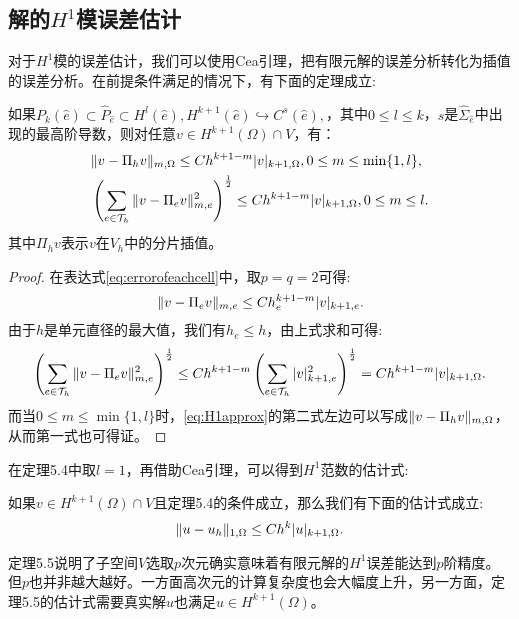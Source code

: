 \subsection{解的$H^{1}$模误差估计}
对于$H^{1}$模的误差估计，我们可以使用Cea引理，把有限元解的误差分析转化为插值的误差分析。在前提条件满足的情况下，有下面的定理成立:
\begin{theorem}
    如果$P_{k}(\hat{e})\subset\hat{P}_{\hat{e}}\subset H^{l}(\hat{e}), H^{k+1}(\hat{e})\hookrightarrow C^{s}(\hat{e}),$，其中$0\le l\le k$，$s$是$\hat{\Sigma}_{\hat{e}}$中出现的最高阶导数，则对任意$v\in H^{k+1}(\Omega)\cap V$，有：
    \begin{equation}
        \label{eq:H1approx}
        \begin{aligned}
            &\|v-\Pi_{h}v\|_{m,\Omega}\le Ch^{k+1-m}|v|_{k+1,\Omega},0\le m\le \min\{1,l\},\\
            &\left(\sum_{e\in\mathcal{T}_{h}}\|v-\Pi_{e}v\|_{m,e}^{2}\right)^{\frac{1}{2}}\le Ch^{k+1-m}|v|_{k+1,\Omega},0\le m\le l.
        \end{aligned}
    \end{equation}
    其中$\Pi_{h}v$表示$v$在$V_{h}$中的分片插值。
\end{theorem}
\begin{proof}
    在表达式\eqref{eq:errorofeachcell}中，取$p=q=2$可得:
    \begin{equation}
        \|v-\Pi_{e}v\|_{m,e}\le Ch_{e}^{k+1-m}|v|_{k+1,e}.
    \end{equation}
    由于$h$是单元直径的最大值，我们有$h_{e}\le h$，由上式求和可得:
    \begin{equation}
        \left(\sum_{e\in\mathcal{T}_{h}}\|v-\Pi_{e}v\|_{m,e}^{2}\right)^{\frac{1}{2}}\le Ch^{k+1-m}\left(\sum_{e\in\mathcal{T}_{h}}|v|_{k+1,e}^{2}\right)^{\frac{1}{2}}=Ch^{k+1-m}|v|_{k+1,\Omega}.
    \end{equation}
    而当$0\le m\le\min\{1,l\}$时，\eqref{eq:H1approx}的第二式左边可以写成$\|v-\Pi_{h}v\|_{m,\Omega}$，从而第一式也可得证。
\end{proof}
在定理5.4中取$l=1$，再借助Cea引理，可以得到$H^{1}$范数的估计式:
\begin{theorem}
    如果$v\in H^{k+1}(\Omega)\cap V$且定理5.4的条件成立，那么我们有下面的估计式成立:
    \begin{equation}
        \label{eq:approx}
        \|u-u_{h}\|_{1,\Omega}\le Ch^{k}|u|_{k+1,\Omega}.
    \end{equation}
\end{theorem}
\begin{remark}
    定理5.5说明了子空间$V$选取$p$次元确实意味着有限元解的$H^{1}$误差能达到$p$阶精度。但$p$也并非越大越好。一方面高次元的计算复杂度也会大幅度上升，另一方面，定理5.5的估计式需要真实解$u$也满足$u\in H^{k+1}(\Omega)$。
\end{remark}